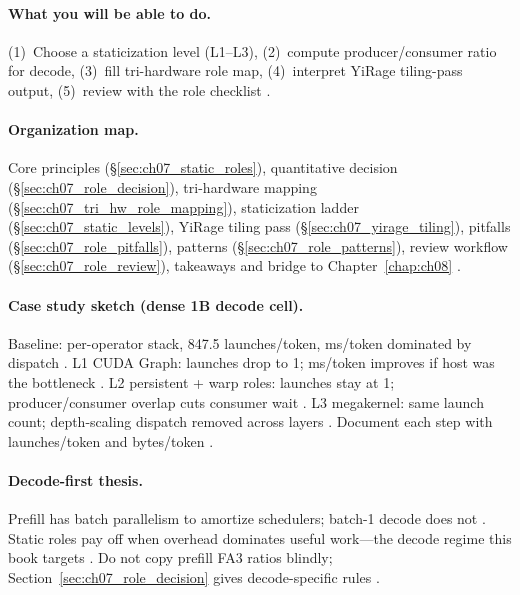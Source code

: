 \paragraph{What you will be able to do.}
(1)~Choose a staticization level (L1--L3), (2)~compute producer/consumer ratio for decode, (3)~fill tri-hardware role map, (4)~interpret YiRage tiling-pass output, (5)~review with the role checklist \citep{yirage2026,shah2024flashattention3,taxbreak2026}.

\paragraph{Organization map.}
Core principles (\S\ref{sec:ch07_static_roles}), quantitative decision (\S\ref{sec:ch07_role_decision}), tri-hardware mapping (\S\ref{sec:ch07_tri_hw_role_mapping}), staticization ladder (\S\ref{sec:ch07_static_levels}), YiRage tiling pass (\S\ref{sec:ch07_yirage_tiling}), pitfalls (\S\ref{sec:ch07_role_pitfalls}), patterns (\S\ref{sec:ch07_role_patterns}), review workflow (\S\ref{sec:ch07_role_review}), takeaways and bridge to Chapter~\ref{chap:ch08} \citep{semianalysis2024tma,dao2022flashattention}.

\paragraph{Case study sketch (dense 1B decode cell).}
Baseline: per-operator stack, 847.5 launches/token, ms/token dominated by dispatch \citep{taxbreak2026,patel2025llminference}.
L1 CUDA Graph: launches drop to 1; ms/token improves if host was the bottleneck \citep{nvidia2024cudagraphs,memoryfloor2026}.
L2 persistent + warp roles: launches stay at 1; producer/consumer overlap cuts consumer wait \citep{shah2024flashattention3,yirage2026}.
L3 megakernel: same launch count; depth-scaling dispatch removed across layers \citep{mpk2025,taxbreak2026,wu2024mirage}.
Document each step with launches/token and bytes/token \citep{dao2022flashattention,memoryfloor2026,chen2020compilerbasedhardw}.

\paragraph{Decode-first thesis.}
Prefill has batch parallelism to amortize schedulers; batch-1 decode does not \citep{kwon2023vllm,memoryfloor2026}.
Static roles pay off when overhead dominates useful work---the decode regime this book targets \citep{patel2025llminference,taxbreak2026}.
Do not copy prefill FA3 ratios blindly; Section~\ref{sec:ch07_role_decision} gives decode-specific rules \citep{shah2024flashattention3}.

